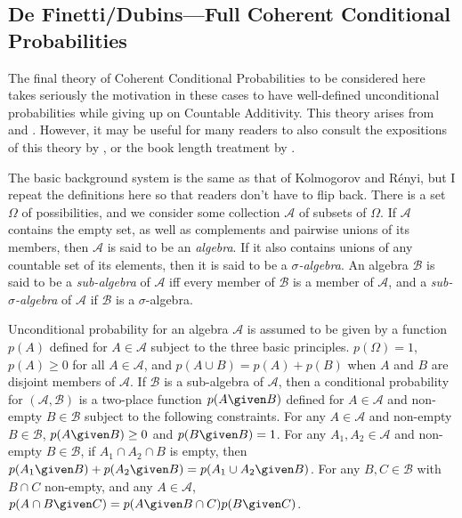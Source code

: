 \subsection{De Finetti/Dubins---Full Coherent Conditional Probabilities}\label{full}

The final theory of Coherent Conditional Probabilities to be considered here takes seriously the motivation in these cases to have well-defined unconditional probabilities while giving up on Countable Additivity. This theory arises from \citet{definetti} and \citet[section 3]{dubins}. However, it may be useful for many readers to also consult the expositions of this theory by \citet{seidnocount, sskkappa}, or the book length treatment by \citet{colscozz}.

The basic background system is the same as that of Kolmogorov and R\'{e}nyi, but I repeat the definitions here so that readers don't have to flip back. There is a set $\Omega$ of possibilities, and we consider some collection $\mathcal{A}$ of subsets of $\Omega$. If $\mathcal{A}$ contains the empty set, as well as complements and pairwise unions of its members, then $\mathcal{A}$ is said to be an \textit{algebra}. If it also contains unions of any countable set of its elements, then it is said to be a \textit{$\sigma$-algebra}. An algebra $\mathcal{B}$ is said to be a \textit{sub-algebra} of $\mathcal{A}$ iff every member of $\mathcal{B}$ is a member of $\mathcal{A}$, and a \textit{sub-$\sigma$-algebra} of $\mathcal{A}$ if $\mathcal{B}$ is a $\sigma$-algebra.

Unconditional probability for an algebra $\mathcal{A}$ is assumed to be given by a function $p(A)$ defined for $A\in\mathcal{A}$ subject to the three basic principles. $p(\Omega)=1$, $p(A)\geq 0$ for all $A\in\mathcal{A}$, and $p(A\cup B)=p(A)+p(B)$ when $A$ and $B$ are disjoint members of $\mathcal{A}$. If $\mathcal{B}$ is a sub-algebra of $\mathcal{A}$, then a conditional probability for $(\mathcal{A},\mathcal{B})$ is a two-place function $p(A \given B)$ defined for $A\in\mathcal{A}$ and non-empty $B\in\mathcal{B}$ subject to the following constraints. For any $A\in\mathcal{A}$ and non-empty $B\in\mathcal{B}$, $p(A \given B)\geq 0$ and $p(B \given B)=1$. For any $A_1,A_2\in\mathcal{A}$ and non-empty $B\in\mathcal{B}$, if $A_1\cap A_2\cap B$ is empty, then $p(A_1 \given B)+p(A_2 \given B)=p(A_1\cup A_2 \given B)$. For any $B,C\in\mathcal{B}$ with $B\cap C$ non-empty, and any $A\in\mathcal{A}$, $p(A\cap B \given C)=p(A \given B\cap C)p(B \given C)$.

